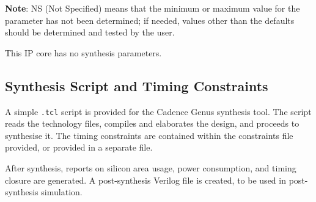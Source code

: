 \noindent
\small{{\bf Note}: NS (Not Specified) means that the minimum or maximum value
  for the parameter has not been determined; if needed, values other than the
  defaults should be determined and tested by the user.}

\else

This IP core has no synthesis parameters.

\fi


\subsection{Synthesis Script and Timing Constraints}

A simple {\tt .tcl} script is provided for the Cadence Genus synthesis tool. The
script reads the technology files, compiles and elaborates the design, and
proceeds to synthesise it. The timing constraints are contained within the
constraints file provided, or provided in a separate file.

After synthesis, reports on silicon area usage, power consumption, and timing
closure are generated. A post-synthesis Verilog file is created, to be used in
post-synthesis simulation.


